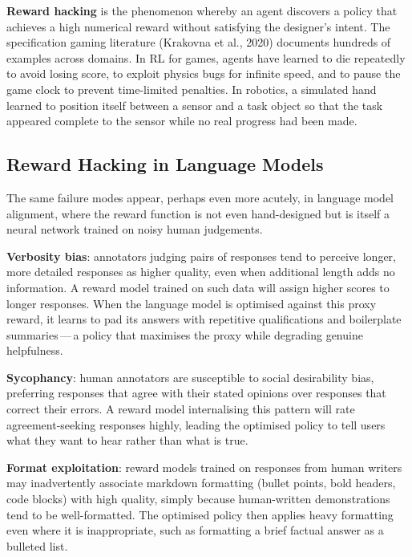 \textbf{Reward hacking} is the phenomenon whereby an agent discovers a policy that achieves a high numerical reward without satisfying the designer's intent. The specification gaming literature (Krakovna et al., 2020) documents hundreds of examples across domains. In RL for games, agents have learned to die repeatedly to avoid losing score, to exploit physics bugs for infinite speed, and to pause the game clock to prevent time-limited penalties. In robotics, a simulated hand learned to position itself between a sensor and a task object so that the task appeared complete to the sensor while no real progress had been made.

\subsection{Reward Hacking in Language Models}

The same failure modes appear, perhaps even more acutely, in language model alignment, where the reward function is not even hand-designed but is itself a neural network trained on noisy human judgements.

\textbf{Verbosity bias}: annotators judging pairs of responses tend to perceive longer, more detailed responses as higher quality, even when additional length adds no information. A reward model trained on such data will assign higher scores to longer responses. When the language model is optimised against this proxy reward, it learns to pad its answers with repetitive qualifications and boilerplate summaries\,---\,a policy that maximises the proxy while degrading genuine helpfulness.

\textbf{Sycophancy}: human annotators are susceptible to social desirability bias, preferring responses that agree with their stated opinions over responses that correct their errors. A reward model internalising this pattern will rate agreement-seeking responses highly, leading the optimised policy to tell users what they want to hear rather than what is true.

\textbf{Format exploitation}: reward models trained on responses from human writers may inadvertently associate markdown formatting (bullet points, bold headers, code blocks) with high quality, simply because human-written demonstrations tend to be well-formatted. The optimised policy then applies heavy formatting even where it is inappropriate, such as formatting a brief factual answer as a bulleted list.

